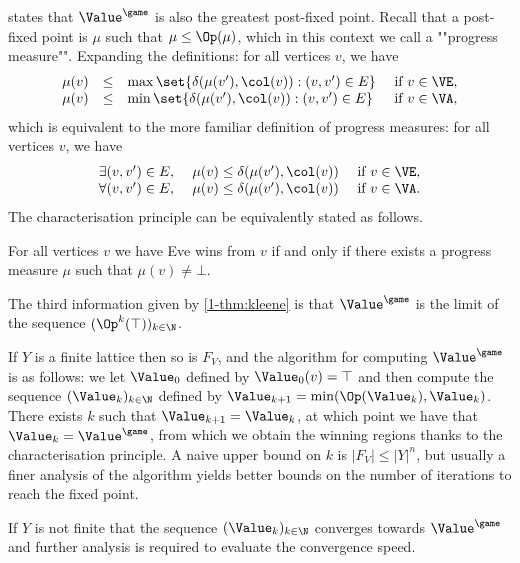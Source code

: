  states that $\Value^{\game}$ is also the greatest post-fixed point.
Recall that a post-fixed point is $\mu$ such that $\mu \le \Op(\mu)$, which in this context we call a ""progress measure"".
Expanding the definitions: for all vertices $v$, we have
\[
\begin{array}{llll}
\mu(v) & \le & \max \set{\delta( \mu(v'), \col(v)) : (v,v') \in E} & \text{ if } v \in \VE, \\
\mu(v) & \le & \min \set{\delta( \mu(v'), \col(v)) : (v,v') \in E} & \text{ if } v \in \VA,
\end{array}
\]
which is equivalent to the more familiar definition of progress measures: for all vertices $v$, we have
\[
\begin{array}{llll}
\exists (v,v') \in E,\ & \mu(v) \le \delta( \mu(v'), \col(v)) & \text{ if } v \in \VE, \\
\forall (v,v') \in E,\ & \mu(v) \le \delta( \mu(v'), \col(v)) & \text{ if } v \in \VA.
\end{array}
\]
The characterisation principle can be equivalently stated as follows.

\begin{principle}
For all vertices $v$ we have Eve wins from $v$ if and only if there exists a progress measure $\mu$ such that $\mu(v) \neq \bot$.
\end{principle}

The third information given by \cref{1-thm:kleene} is that $\Value^{\game}$ is the limit of the sequence $(\Op^k(\top))_{k \in \N}$.

If $Y$ is a finite lattice then so is $F_V$, and the algorithm for computing $\Value^{\game}$ is as follows:
we let $\Value_0$ defined by $\Value_0(v) = \top$ and then compute the sequence $(\Value_k)_{k \in \N}$ defined by 
$\Value_{k+1} = \min(\Op(\Value_k), \Value_k)$.
There exists $k$ such that $\Value_{k+1} = \Value_k$, at which point we have that $\Value_k = \Value^{\game}$,
from which we obtain the winning regions thanks to the characterisation principle.
A naive upper bound on $k$ is $|F_V| \le |Y|^n$, but usually a finer analysis of the algorithm yields better bounds on the number of iterations to reach the fixed point.

If $Y$ is not finite that the sequence $(\Value_k)_{k \in \N}$ converges towards $\Value^{\game}$ and further analysis is required to evaluate the convergence speed.

